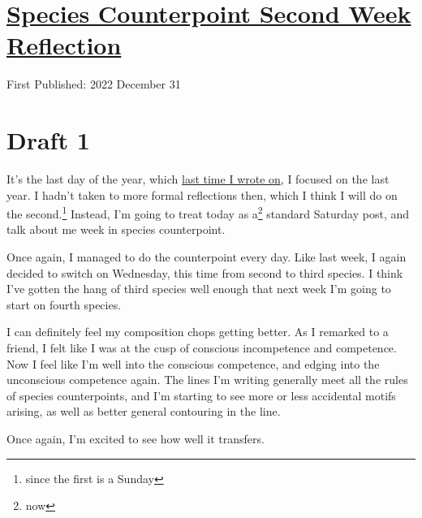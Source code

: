\documentclass[12pt]{article}[titlepage]
\newcommand{\1}{\={a}}
\newcommand{\2}{\={e}}
\newcommand{\3}{\={\i}}
\newcommand{\4}{\=o}
\newcommand{\5}{\=u}
\newcommand{\6}{\={A}}
\renewcommand{\,}{\textsuperscript{,}}
\begin{document}
\doublespacing
\section{\href{species-counterpoint-week-2.html}{Species Counterpoint Second Week Reflection}}
First Published: 2022 December 31

\section{Draft 1}
It's the last day of the year, which \href{ending-18.html}{last time I wrote on}, I focused on the last year.
I hadn't taken to more formal reflections then, which I think I will do on the second.\footnote{since the first is a Sunday}
Instead, I'm going to treat today as a\footnote{now} standard Saturday post, and talk about me week in species counterpoint.

Once again, I managed to do the counterpoint every day.
Like last week, I again decided to switch on Wednesday, this time from second to third species.
I think I've gotten the hang of third species well enough that next week I'm going to start on fourth species.

I can definitely feel my composition chops getting better.
As I remarked to a friend, I felt like I was at the cusp of conscious incompetence and competence.
Now I feel like I'm well into the conscious competence, and edging into the unconscious competence again.
The lines I'm writing generally meet all the rules of species counterpoints, and I'm starting to see more or less accidental motifs arising, as well as better general contouring in the line.

Once again, I'm excited to see how well it transfers.
\end{document}
